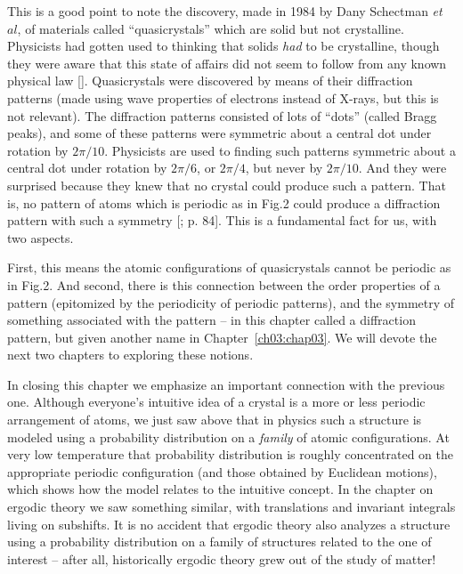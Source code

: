 \documentclass[reqno]{stml-l}
\theoremstyle{plain}
\theoremstyle{definition}
\numberwithin{equation}{chapter}
\begin{document}
This is a good point to note the discovery, made in 1984 by Dany Schectman \emph{et} $al$, of materials called ``quasicrystals'' which are solid but not crystalline. Physicists had gotten used to thinking that solids \emph{had} to be crystalline, though they were aware that this state of affairs did not seem to follow from any known physical law []. Quasicrystals were discovered by means of their diffraction patterns (made using wave properties of electrons instead of X-rays, but this is not relevant). The diffraction patterns consisted of lots of ``dots'' (called Bragg peaks), and some of these patterns were symmetric about a central dot under rotation by $2\pi/10$. Physicists are used to finding such patterns symmetric about a central dot under rotation by $2\pi/6$, or $2\pi/4$, but never by $2\pi/10$. And they were surprised because they knew that no crystal could produce such a pattern. That is, no pattern of atoms which is periodic as in Fig.2 could produce a diffraction pattern with such a symmetry [; p. 84]. This is a fundamental fact for us, with two aspects.

First, this means the atomic configurations of quasicrystals cannot be periodic as in Fig.2. And second, there is this connection between the order properties of a pattern (epitomized by the periodicity of periodic patterns), and the symmetry of something associated with the pattern -- in this chapter called a diffraction pattern, but given another name in Chapter~\ref{ch03:chap03}. We will devote the next two chapters to exploring these notions.

In closing this chapter we emphasize an important connection with the previous one. Although everyone's intuitive idea of a crystal is a more or less periodic arrangement of atoms, we just saw above that in physics such a structure is modeled using a probability distribution on a \emph{family} of atomic configurations. At very low temperature that probability distribution is roughly concentrated on the appropriate periodic configuration (and those obtained by Euclidean motions), which shows how the model relates to the intuitive concept. In the chapter on ergodic theory we saw something similar, with translations and invariant integrals living on subshifts. It is no accident that ergodic theory also analyzes a structure using a probability distribution on a family of structures related to the one of interest -- after all, historically ergodic theory grew out of the study of matter!
\end{document}
